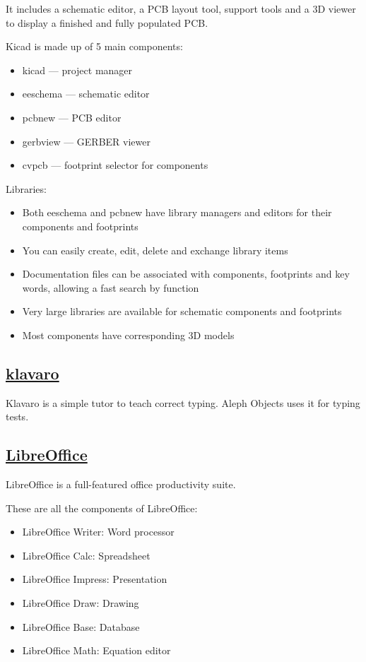  It includes a schematic editor, a PCB layout tool, support tools and a
 3D viewer to display a finished and fully populated PCB.
 
 Kicad is made up of 5 main components:

\begin{itemize}
 \item  kicad --- project manager
 \item  eeschema --- schematic editor
 \item  pcbnew --- PCB editor
 \item  gerbview --- GERBER viewer
 \item  cvpcb --- footprint selector for components
\end{itemize}
 
 Libraries:

\begin{itemize}
 \item Both eeschema and pcbnew have library managers and editors for their
    components and footprints
 \item You can easily create, edit, delete and exchange library items
 \item Documentation files can be associated with components, footprints and key
    words, allowing a fast search by function
 \item Very large libraries are available for schematic components and footprints
 \item Most components have corresponding 3D models
\end{itemize}

\subsection{\href{http://klavaro.sourceforge.net/}{klavaro}}

Klavaro is a simple tutor to teach correct typing.
Aleph Objects uses it for typing tests.
 
\subsection{\href{http://www.libreoffice.org}{LibreOffice}}

 LibreOffice is a full-featured office productivity suite.
 
 These are all the components of LibreOffice:

\begin{itemize}
 \item LibreOffice Writer: Word processor
 \item LibreOffice Calc: Spreadsheet
 \item LibreOffice Impress: Presentation
 \item LibreOffice Draw: Drawing
 \item LibreOffice Base: Database
 \item LibreOffice Math: Equation editor
\end{itemize}
 
